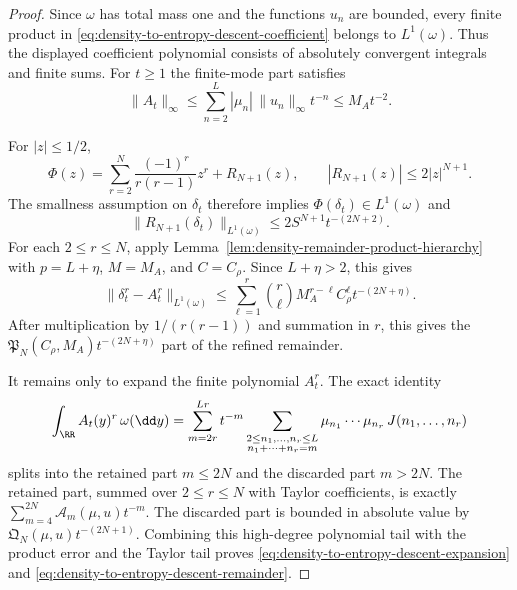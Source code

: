 \begin{proof}
Since $\omega$ has total mass one and the functions $u_n$ are bounded, every
finite product in \eqref{eq:density-to-entropy-descent-coefficient} belongs to
$L^1(\omega)$.  Thus the displayed coefficient polynomial consists of
absolutely convergent integrals and finite sums.
For $t\ge1$ the finite-mode part satisfies
\[
\|A_t\|_\infty
\le\sum_{n=2}^{L}|\mu_n|\,\|u_n\|_\infty t^{-n}
\le M_A t^{-2}.
\]

For $|z|\le1/2$,
\[
\Phi(z)=\sum_{r=2}^{N}\frac{(-1)^r}{r(r-1)}z^r+R_{N+1}(z),
\qquad |R_{N+1}(z)|\le2|z|^{N+1}.
\]
The smallness assumption on $\delta_t$ therefore implies
$\Phi(\delta_t)\in L^1(\omega)$ and
\[
\|R_{N+1}(\delta_t)\|_{L^1(\omega)}
\le2S^{N+1}t^{-(2N+2)}.
\]
For each $2\le r\le N$, apply
Lemma~\ref{lem:density-remainder-product-hierarchy} with
$p=L+\eta$, $M=M_A$, and $C=C_\rho$.  Since $L+\eta>2$, this gives
\[
\|\delta_t^r-A_t^r\|_{L^1(\omega)}
\le
\sum_{\ell=1}^{r}\binom r\ell
M_A^{r-\ell}C_\rho^\ell t^{-(2N+\eta)}.
\]
After multiplication by $1/(r(r-1))$ and summation in $r$, this gives the
$\mathfrak P_N(C_\rho,M_A)t^{-(2N+\eta)}$ part of the refined remainder.

It remains only to expand the finite polynomial $A_t^r$.  The exact identity
\[
\int_{\RR}A_t(y)^r\,\omega(\dd y)
=
\sum_{m=2r}^{Lr}t^{-m}
\sum_{\substack{2\le n_1,\ldots,n_r\le L\\
n_1+\cdots+n_r=m}}
\mu_{n_1}\cdots\mu_{n_r}\,J(n_1,\ldots,n_r)
\]
splits into the retained part $m\le2N$ and the discarded part $m>2N$.  The
retained part, summed over $2\le r\le N$ with Taylor coefficients, is exactly
$\sum_{m=4}^{2N}\mathcal A_m(\mu,u)t^{-m}$.  The discarded part is bounded in
absolute value by $\mathfrak Q_N(\mu,u)t^{-(2N+1)}$.  Combining this
high-degree polynomial tail with the product error and the Taylor tail proves
\eqref{eq:density-to-entropy-descent-expansion} and
\eqref{eq:density-to-entropy-descent-remainder}.
\end{proof}

